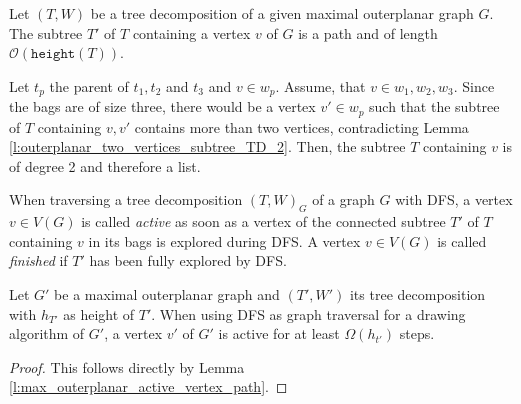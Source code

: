 \begin{lemma}
	Let $(T,W)$ be a tree decomposition of a given maximal outerplanar graph $G$. The subtree $T'$ of $T$ containing a vertex $v$ of $G$ is a path and of length $\mathcal{O}(\texttt{height}(T))$.\label{l:max_outerplanar_active_vertex_path}
\end{lemma}
Let $t_p$ the parent of $t_1,t_2$ and $t_3$ and $v \in w_p$. Assume, that $v \in w_1,w_2,w_3$. Since the bags are of size three, there would be a vertex $v'\in w_p$ such that the subtree of $T$ containing $v,v'$ contains more than two vertices, contradicting Lemma \ref{l:outerplanar_two_vertices_subtree_TD_2}. Then, the subtree $T$ containing $v$ is of degree 2 and therefore a list.

\begin{definition}
	When traversing a tree decomposition $(T,W)_G$ of a graph $G$ with DFS, a vertex $v\in V(G)$ is called \emph{active} as soon as a vertex of the connected subtree $T'$ of $T$ containing $v$ in its bags is explored during DFS. A vertex $v\in V(G)$ is called \emph{finished} if $T'$ has been fully explored by DFS.
\end{definition}

\begin{lemma}
	Let $G'$ be a maximal outerplanar graph and $(T',W')$ its tree decomposition with $h_{T'}$ as height of $T'$. When using DFS as graph traversal for a drawing algorithm of $G'$, a vertex $v'$ of $G'$ is active for at least $\Omega(h_{t'})$ steps.\label{l:one_vertex_active_height}
\end{lemma}
\begin{proof}
	This follows directly by Lemma \ref{l:max_outerplanar_active_vertex_path}.
\end{proof}

